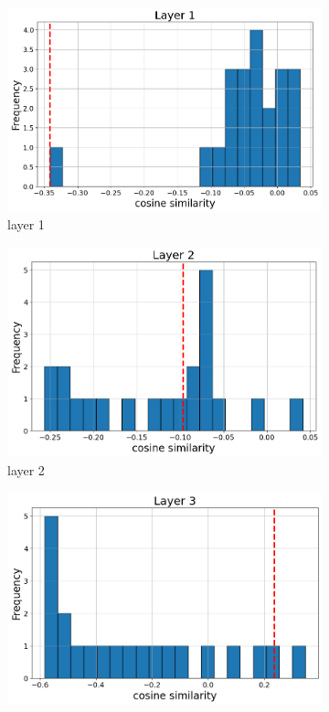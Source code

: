 \documentclass[11pt]{article}
\begin{document}
\begin{figure}[t]
  \begin{subfigure}[t]{0.24\textwidth}
    \centering
    \includegraphics[width=1.4\columnwidth]{figures/obs2_appendix/obs2_layer1.png}
    \caption{layer 1}
  \end{subfigure}\hfill
  \begin{subfigure}[t]{0.24\textwidth}
    \centering
    \includegraphics[width=1.4\columnwidth]{figures/obs2_appendix/obs2_layer2.png}
    \caption{layer 2}
  \end{subfigure}\hfill
  \begin{subfigure}[t]{0.24\textwidth}
    \centering
    \includegraphics[width=1.4\columnwidth]{figures/obs2_appendix/obs2_layer3.png}

\end{subfigure}
\end{figure}
\end{document}
